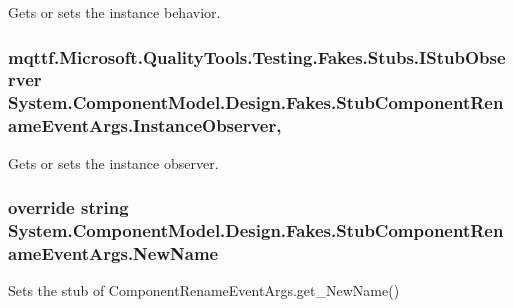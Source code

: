 Gets or sets the instance behavior.

\hypertarget{class_system_1_1_component_model_1_1_design_1_1_fakes_1_1_stub_component_rename_event_args_aad1f4867dcf68de0f022083c700b3edb}{
\subsubsection[{Instance\-Observer}]{\setlength{\rightskip}{0pt plus 5cm}mqttf.\-Microsoft.\-Quality\-Tools.\-Testing.\-Fakes.\-Stubs.\-I\-Stub\-Observer System.\-Component\-Model.\-Design.\-Fakes.\-Stub\-Component\-Rename\-Event\-Args.\-Instance\-Observer\hspace{0.3cm}{\ttfamily [get]}, {\ttfamily [set]}}}\label{class_system_1_1_component_model_1_1_design_1_1_fakes_1_1_stub_component_rename_event_args_aad1f4867dcf68de0f022083c700b3edb}


Gets or sets the instance observer.

\hypertarget{class_system_1_1_component_model_1_1_design_1_1_fakes_1_1_stub_component_rename_event_args_a3292efc847982cef08e3f5f843dcd905}{
\subsubsection[{New\-Name}]{\setlength{\rightskip}{0pt plus 5cm}override string System.\-Component\-Model.\-Design.\-Fakes.\-Stub\-Component\-Rename\-Event\-Args.\-New\-Name\hspace{0.3cm}{\ttfamily [get]}}}\label{class_system_1_1_component_model_1_1_design_1_1_fakes_1_1_stub_component_rename_event_args_a3292efc847982cef08e3f5f843dcd905}


Sets the stub of Component\-Rename\-Event\-Args.\-get\-\_\-\-New\-Name()

